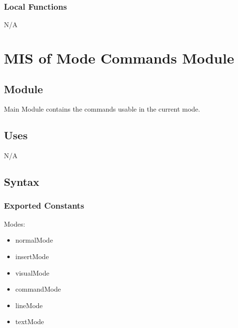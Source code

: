 \documentclass[12pt, titlepage]{article}
\begin{document}
%

\subsubsection{Local Functions}

N/A

\newpage
\section{MIS of {Mode Commands Module}} \label{Mode Commands Module}
%
%

\subsection{Module}

Main Module contains the commands usable in the current mode.

\subsection{Uses}
N/A
\subsection{Syntax}

\subsubsection{Exported Constants}
Modes:
\begin{itemize}
\item{normalMode}
\item{insertMode}
\item{visualMode}
\item{commandMode}
\item{lineMode}
\item{textMode}
\end{itemize}
\end{document}

